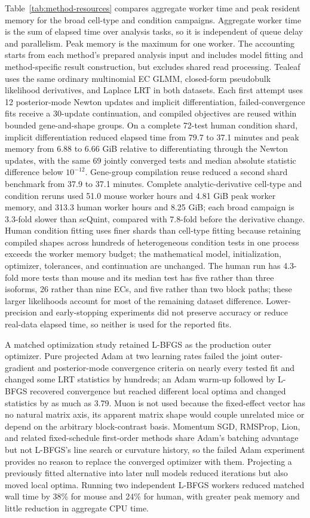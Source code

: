 \documentclass[11pt]{article}
\begin{document}
Table~\ref{tab:method-resources} compares aggregate worker time and peak resident memory for the broad cell-type and condition campaigns. Aggregate worker time is the sum of elapsed time over analysis tasks, so it is independent of queue delay and parallelism. Peak memory is the maximum for one worker. The accounting starts from each method's prepared analysis input and includes model fitting and method-specific result construction, but excludes shared read processing. Tealeaf uses the same ordinary multinomial EC GLMM, closed-form pseudobulk likelihood derivatives, and Laplace LRT in both datasets. Each first attempt uses 12 posterior-mode Newton updates and implicit differentiation, failed-convergence fits receive a 30-update continuation, and compiled objectives are reused within bounded gene-and-shape groups. On a complete 72-test human condition shard, implicit differentiation reduced elapsed time from 79.7 to 37.1 minutes and peak memory from 6.88 to 6.66 GiB relative to differentiating through the Newton updates, with the same 69 jointly converged tests and median absolute statistic difference below \(10^{-12}\). Gene-group compilation reuse reduced a second shard benchmark from 37.9 to 37.1 minutes. Complete analytic-derivative cell-type and condition reruns used 51.0 mouse worker hours and 4.81 GiB peak worker memory, and 313.3 human worker hours and 8.25 GiB; each broad campaign is 3.3-fold slower than scQuint, compared with 7.8-fold before the derivative change. Human condition fitting uses finer shards than cell-type fitting because retaining compiled shapes across hundreds of heterogeneous condition tests in one process exceeds the worker memory budget; the mathematical model, initialization, optimizer, tolerances, and continuation are unchanged. The human run has 4.3-fold more tests than mouse and its median test has five rather than three isoforms, 26 rather than nine ECs, and five rather than two block paths; these larger likelihoods account for most of the remaining dataset difference. Lower-precision and early-stopping experiments did not preserve accuracy or reduce real-data elapsed time, so neither is used for the reported fits.

A matched optimization study retained L-BFGS as the production outer optimizer. Pure projected Adam at two learning rates failed the joint outer-gradient and posterior-mode convergence criteria on nearly every tested fit and changed some LRT statistics by hundreds; an Adam warm-up followed by L-BFGS recovered convergence but reached different local optima and changed statistics by as much as 3.79. Muon is not used because the fixed-effect vector has no natural matrix axis, its apparent matrix shape would couple unrelated mice or depend on the arbitrary block-contrast basis. Momentum SGD, RMSProp, Lion, and related fixed-schedule first-order methods share Adam's batching advantage but not L-BFGS's line search or curvature history, so the failed Adam experiment provides no reason to replace the converged optimizer with them. Projecting a previously fitted alternative into later null models reduced iterations but also moved local optima. Running two independent L-BFGS workers reduced matched wall time by 38\% for mouse and 24\% for human, with greater peak memory and little reduction in aggregate CPU time.
\end{document}
